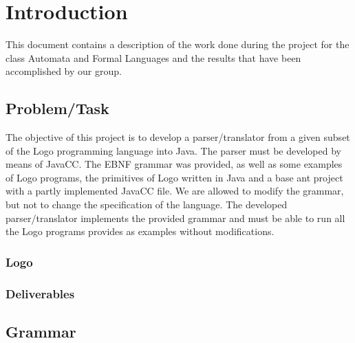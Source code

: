 \chapter{Introduction}
\label{chap:introduction}

This document contains a description of the work done during the project for the class Automata and Formal Languages and the results that have been accomplished by our group.

\section{Problem/Task}
\label{sec:problem_task}

The objective of this project is to develop a parser/translator from a given subset of the Logo programming language into Java. The parser must be developed by means of JavaCC. The EBNF grammar was provided, as well as some examples of Logo programs, the primitives of Logo written in Java and a base ant project with a partly implemented JavaCC file. We are allowed to modify the grammar, but not to change the specification of the language. The developed parser/translator implements the provided grammar and must be able to run all the Logo programs provides as examples without modifications.

\subsection{Logo}
\label{sec:logo}

\subsection{Deliverables}
\label{sec:deliverables}

\section{Grammar}
\label{sec:grammar}
